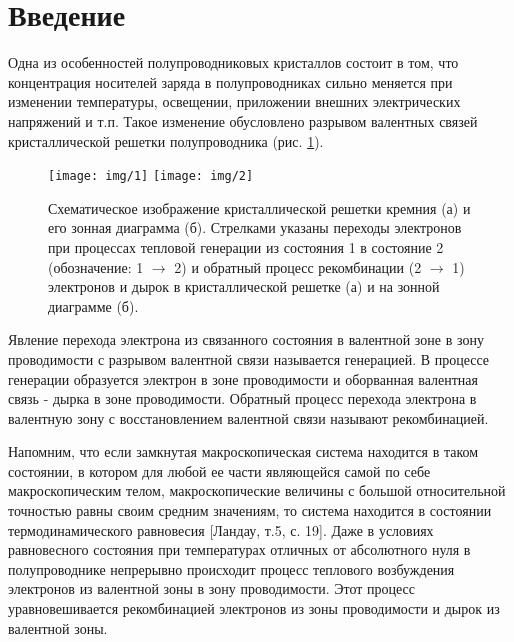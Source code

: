 

\def\labauthors{Карусевич А.А, Понур К.А.}
\def\labgroup{430}
\def\department{Кафедра электроники и квантовой физики}
\def\labnumber{2}
\def\labtheme{Измерение времени жизни и диффузионной длины}

\renewcommand{\phi}{\varphi}


\section*{Введение}

Одна из особенностей полупроводниковых кристаллов состоит в том, что концентрация носителей заряда в полупроводниках сильно меняется при изменении температуры, освещении, приложении внешних электрических напряжений и т.п. Такое изменение обусловлено разрывом валентных связей кристаллической решетки полупроводника (рис. \ref{fig:figure1}).
\begin{figure}[H]
	\centering
	\texttt{[image: img/1]}
	\texttt{[image: img/2]}
	\caption{Схематическое изображение кристаллической решетки кремния (а) и его зонная диаграмма (б). Стрелками указаны переходы электронов при процессах тепловой генерации из состояния 1 в состояние 2 (обозначение: 1 $\to$ 2) и обратный процесс рекомбинации (2 $\to$ 1) электронов и дырок в кристаллической решетке (а) и на зонной диаграмме (б).}
	\label{fig:figure1}
\end{figure}

Явление перехода электрона из связанного состояния в валентной зоне в зону проводимости с разрывом валентной связи называется генерацией. В процессе генерации образуется электрон в зоне проводимости и оборванная валентная связь - дырка в зоне проводимости. Обратный процесс перехода электрона в валентную зону с восстановлением валентной связи называют рекомбинацией.

Напомним, что если замкнутая макроскопическая система находится в таком состоянии, в котором для любой ее части являющейся самой по себе макроскопическим телом, макроскопические величины с большой относительной точностью равны своим средним значениям, то система находится в состоянии термодинамического равновесия [Ландау, т.5, с. 19]. Даже в условиях равновесного состояния при температурах отличных от абсолютного нуля в полупроводнике непрерывно происходит процесс теплового возбуждения электронов из валентной зоны в зону проводимости. Этот процесс уравновешивается рекомбинацией электронов из зоны проводимости и дырок из валентной зоны.

